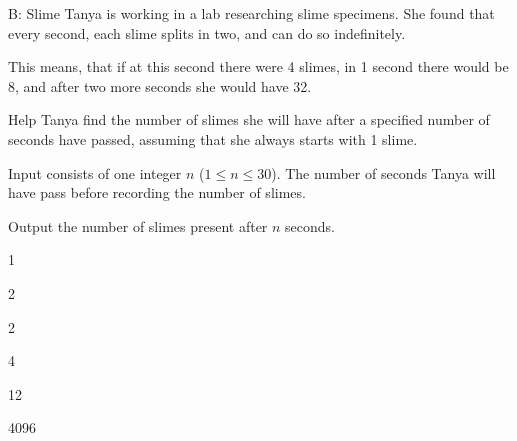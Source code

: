 \begin{problem}{B: Slime}
Tanya is working in a lab researching slime specimens. She found that every second, each slime splits in two, and can do so indefinitely.

This means, that if at this second there were 4 slimes, in 1 second there would be 8, and after two more seconds she would have 32.

Help Tanya find the number of slimes she will have after a specified number of seconds have passed, assuming that she always starts with 1 slime. 
\end{problem}

\begin{formalin}
Input consists of one integer $n$ ($1 \leq n \leq 30$). The number of seconds Tanya will have pass before recording the number of slimes.
\end{formalin}

\begin{formalout}
Output the number of slimes present after $n$ seconds.
\end{formalout}

\begin{datain}
1
\end{datain}
\begin{dataout}
2
\end{dataout}

\begin{datain}
2
\end{datain}
\begin{dataout}
4
\end{dataout}

\begin{datain}
12
\end{datain}
\begin{dataout}
4096
\end{dataout}

